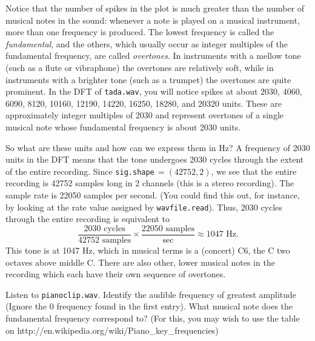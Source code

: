 Notice that the number of spikes in the plot is much greater than the number of musical notes in the sound: whenever a note is played on a musical instrument, more than one frequency is produced.
The lowest frequency is called the \emph{fundamental}, and the others, which usually occur as integer multiples of the fundamental frequency, are called \emph{overtones}.
In instruments with a mellow tone (such as a flute or vibraphone) the overtones are relatively soft, while in instruments with a brighter tone (such as a trumpet) the overtones are quite prominent.
In the DFT of \texttt{tada.wav}, you will notice spikes at about 2030, 4060, 6090, 8120, 10160, 12190, 14220, 16250, 18280, and 20320 units.
These are approximately integer multiples of 2030 and represent overtones of a single musical note whose fundamental frequency is about 2030 units.

So what are these units and how can we express them in Hz? 
A frequency of 2030 units in the DFT means that the tone undergoes 2030 cycles through the extent of the entire recording. 
Since \texttt{sig.shape}$\, = (42752, 2)$, we see that the entire recording is 42752 samples long in 2 channels (this is a stereo recording).
The sample rate is 22050 samples per second.
(You could find this out, for instance, by looking at the rate value assigned by \texttt{wavfile.read}). 
Thus, 2030 cycles through the entire recording is equivalent to
$$\frac{2030\text{ cycles}}{42752\text{ samples}} \times \frac{22050\text{ samples}}{\text{sec}} \approx 1047 \text{ Hz}.$$
This tone is at 1047 Hz, which in musical terms is a (concert) C6, the C two octaves above middle C.
There are also other, lower musical notes in the recording which each have their own sequence of overtones.

\begin{problem}
Listen to \texttt{pianoclip.wav}.
Identify the audible frequency of greatest amplitude (Ignore the 0 frequency found in the first entry). 
What musical note does the fundamental frequency correspond to?
(For this, you may wish to use the table on http://en.wikipedia.org/wiki/Piano\_key\_frequencies)
\end{problem}

